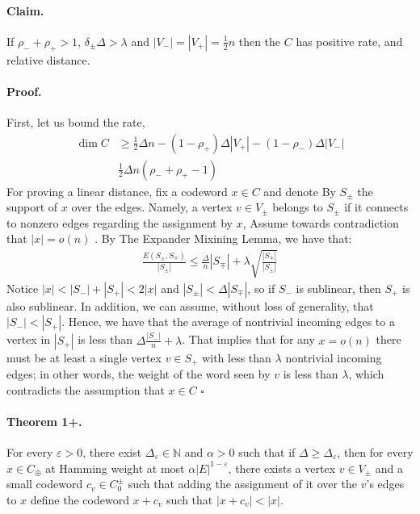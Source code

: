 \documentclass{article}
\begin{document}
\begin{multicols*}{2}
  \paragraph{Claim.} If $\rho_{-} + \rho_{+} > 1$, $\delta_{\pm}\Delta > \lambda$ and $|V_{-}| = |V_{+}| = \frac{1}{2}n$ then the $C$ has positive rate, and relative distance. 
  \paragraph{Proof.} First, let us bound the rate, 
  \begin{equation*}
    \begin{split}
      \dim C & \ge \frac{1}{2}\Delta n - \left( 1 - \rho_{+} \right)\Delta|V_{+}| - \left( 1 - \rho_{-} \right)\Delta|V_{-}| \\
      & \frac{1}{2}\Delta n \left( \rho_{-} + \rho_{+}  - 1  \right) 
    \end{split}
  \end{equation*}
  For proving a linear distance, fix a codeword $x \in C$ and denote By $S_{\pm}$ the support of $x$ over the edges. Namely, a vertex $v\in V_{\pm}$ belongs to $S_{\pm}$ if it connects to nonzero edges regarding the assignment by $x$, Assume towards contradiction that $|x| = o\left( n \right)$ . By The Expander Mixining Lemma, we have that: 
  \begin{equation*}
    \begin{split}
      \frac{E\left( S_{\pm}, S_{\mp} \right)}{|S_{\pm}|}\le\frac{\Delta}{n}|S_{\mp}| + \lambda\sqrt{\frac{|S_{\mp}|}{|S_{\pm}|}}
    \end{split}
  \end{equation*}
  Notice $|x| < |S_{-}| + |S_{+}| < 2|x|$ and $|S_{\pm}| < \Delta |S_{\mp}|$, so if $S_{-}$ is sublinear, then $S_{+}$ is also sublinear. In addition, we can assume, without loss of generality, that $|S_{-}| < |S_{+}|$. Hence, we have that the average of nontrivial incoming edges to a vertex in $|S_{+}|$ is less than $ \Delta \frac{|S_{-}|}{n} + \lambda $. That implies that for any $x = o\left( n \right)$ there must be at least a single vertex $ v \in S_{+} $ with less than $ \lambda $ nontrivial incoming edges; in other words, the weight of the word seen by $v$ is less than $\lambda$, which contradicts the assumption that $x\in C$ $\square$

  \paragraph{Theorem 1+.} For every $\varepsilon > 0$, there exist $\Delta_{\varepsilon}\in \mathbb{N}$ and $\alpha>0$ such that if $\Delta \ge \Delta_{\varepsilon}$, then for every $x \in C_{\oplus}$ at Hamming weight at most $\alpha |E|^{1-\varepsilon}$, there exists a vertex $v \in V_{\pm}$ and a small codeword $c_{v} \in C_{0}^{\pm} $ such that adding the assignment of it over the $v$'s edges to $x$ define the codeword $x + c_{v}$  such that $|x + c_{v}| < |x|$.  


\end{multicols*}
\end{document}
